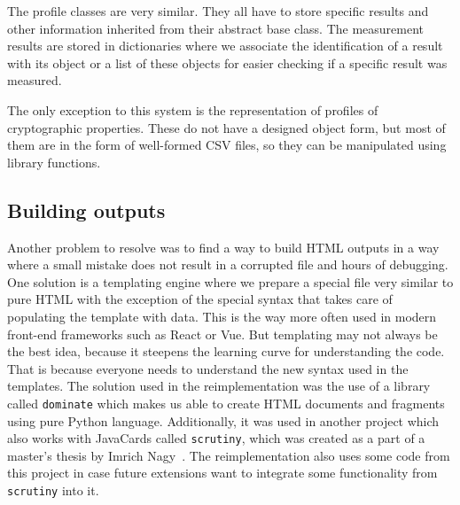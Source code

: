 The profile classes are very similar. They all have to store specific results and other information inherited from their abstract base class. The measurement results are stored in dictionaries where we associate the identification of a result with its object or a list of these objects for easier checking if a specific result was measured.

The only exception to this system is the representation of profiles of cryptographic properties. These do not have a designed object form, but most of them are in the form of well-formed CSV files, so they can be manipulated using library functions.


\subsection{Building outputs}
Another problem to resolve was to find a way to build HTML outputs in a way where a small mistake does not result in a corrupted file and hours of debugging. One solution is a templating engine where we prepare a special file very similar to pure HTML with the exception of the special syntax that takes care of populating the template with data. This is the way more often used in modern front-end frameworks such as React or Vue. But templating may not always be the best idea, because it steepens the learning curve for understanding the code. That is because everyone needs to understand the new syntax used in the templates. The solution used in the reimplementation was the use of a library called \texttt{dominate} which makes us able to create HTML documents and fragments using pure Python language. Additionally, it was used in another project which also works with JavaCards called \texttt{scrutiny}, which was created as a part of a master's thesis by Imrich Nagy~\cite{Nagy2019thesis}. The reimplementation also uses some code from this project in case future extensions want to integrate some functionality from \texttt{scrutiny} into it.

